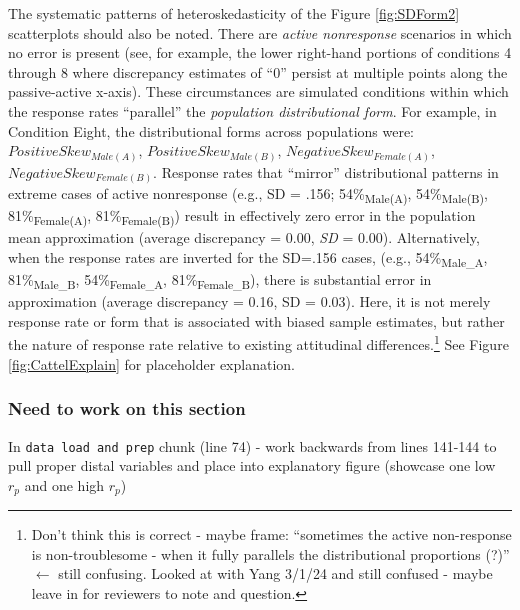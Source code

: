 \documentclass[
  man,mask]{apa7}
\begin{document}
The systematic patterns of heteroskedasticity of the Figure \ref{fig:SDForm2} scatterplots should also be noted. There are \emph{active nonresponse} scenarios in which no error is present (see, for example, the lower right-hand portions of conditions 4 through 8 where discrepancy estimates of ``0'' persist at multiple points along the passive-active x-axis). These circumstances are simulated conditions within which the response rates ``parallel'' the \emph{population distributional form}. For example, in Condition Eight, the distributional forms across populations were: \(Positive Skew_{Male(A)}\), \(Positive Skew_{Male(B)}\), \(Negative Skew_{Female(A)}\), \(Negative Skew_{Female(B)}\). Response rates that ``mirror'' distributional patterns in extreme cases of active nonresponse (e.g., SD = .156; 54\%\textsubscript{Male(A)}, 54\%\textsubscript{Male(B)}, 81\%\textsubscript{Female(A)}, 81\%\textsubscript{Female(B)}) result in effectively zero error in the population mean approximation (average discrepancy = 0.00, \emph{SD} = 0.00). Alternatively, when the response rates are inverted for the SD=.156 cases, (e.g., 54\%\textsubscript{Male\_A}, 81\%\textsubscript{Male\_B}, 54\%\textsubscript{Female\_A}, 81\%\textsubscript{Female\_B}), there is substantial error in approximation (average discrepancy = 0.16, SD = 0.03). Here, it is not merely response rate or form that is associated with biased sample estimates, but rather the nature of response rate relative to existing attitudinal differences.\footnote{Don't think this is correct - maybe frame: ``sometimes the active non-response is non-troublesome - when it fully parallels the distributional proportions (?)'' \(\leftarrow\) still confusing. Looked at with Yang 3/1/24 and still confused - maybe leave in for reviewers to note and question.} See Figure \ref{fig:CattelExplain} for placeholder explanation.

\subsubsection{Need to work on this section}\label{need-to-work-on-this-section}

In \texttt{data\ load\ and\ prep} chunk (line 74) - work backwards from lines 141-144 to pull proper distal variables and place into explanatory figure (showcase one low \(r_p\) and one high \(r_p\))
\end{document}
